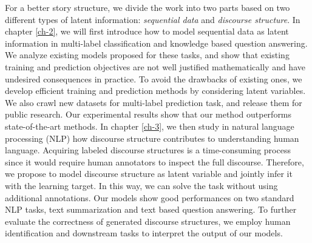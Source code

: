 

For a better story structure, we divide the work into two parts based on two different types of latent information: \textit{sequential data} and \textit{discourse structure}. In chapter \ref{ch-2}, we will first introduce how to model sequential data as latent information in multi-label classification and knowledge based question answering. We analyze existing models proposed for these tasks, and show that existing training and prediction objectives are not well justified mathematically and have undesired consequences in practice. To avoid the drawbacks of existing ones, we develop efficient training and prediction methods by considering latent variables. We also crawl new datasets for multi-label prediction task, and release them for public research. Our experimental results show that our method outperforms state-of-the-art methods. In chapter \ref{ch-3}, we then study in natural language processing (NLP) how discourse structure contributes to understanding human language. Acquiring labeled discourse structures is a time-consuming process since it would require human annotators to inspect the full discourse. Therefore, we propose to model discourse structure as latent variable and jointly infer it with the learning target. In this way, we can solve the task without using additional annotations. Our models show good performances on two standard NLP tasks, text summarization and text based question answering. To further evaluate the correctness of generated discourse structures, we employ human identification and downstream tasks to interpret the output of our models.